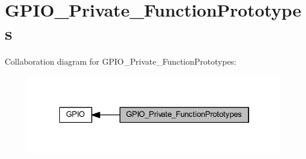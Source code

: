 \hypertarget{group___g_p_i_o___private___function_prototypes}{}\section{G\+P\+I\+O\+\_\+\+Private\+\_\+\+Function\+Prototypes}
\label{group___g_p_i_o___private___function_prototypes}
Collaboration diagram for G\+P\+I\+O\+\_\+\+Private\+\_\+\+Function\+Prototypes\+:
\nopagebreak
\begin{figure}[H]
\begin{center}
\leavevmode
\includegraphics[width=322pt]{group___g_p_i_o___private___function_prototypes}
\end{center}
\end{figure}
